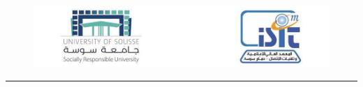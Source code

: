 \begin{titlepage}

  \setcounter{page}{-1}

\setlength{\headheight}{14pt}

\begin{center}

\begin{figure}
  \centering
  \includegraphics[width=\linewidth]{figures/Titlepage/fst_pg_header.png}
\end{figure}



\bigskip
\bigskip
\bigskip

{\makeatletter
\largetitlestyle\fontsize{25}{25}\selectfont{Research Master}
\makeatother}

{\makeatletter
{\medskip\fontsize{17}{17}\selectfont{\@mastertrack}}
\makeatother}

\vspace{0.8cm}

{\makeatletter
\largetitlestyle\fontsize{24}{24}\selectfont{Master Thesis}
\makeatother}


\vspace{0.7cm}

\rule{\linewidth}{0.5pt}

\vspace{0.3cm}

{\makeatletter
\largetitlestyle\fontsize{33}{33}\selectfont\textbf{\@title}
\makeatother}


\end{center}
\end{titlepage}
